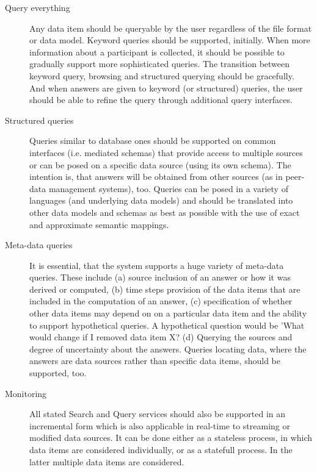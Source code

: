 \begin{description}
\item [Query everything]  Any data item should be queryable  by the user regardless of the file format or data model. Keyword queries should be supported, initially. When more information about a participant is collected, it should be possible to gradually support more sophisticated queries. The transition between keyword query, browsing and structured querying should be gracefully. And when answers are given to keyword (or structured) queries, the user should be able to refine the query through additional query interfaces. 

\item [Structured queries] Queries similar to database ones should be supported on common interfaces (i.e. mediated schemas) that provide access to multiple sources or can be posed on a specific data source (using its own schema). The intention is, that answers will be obtained from other sources (as in peer-data management systems), too. Queries can be posed in a variety of languages (and underlying data models) and should be translated into other data models and schemas as best as possible with the use of exact and approximate semantic mappings.

\item [Meta-data queries] It is essential, that the system supports a huge variety of meta-data queries. These include (a) source inclusion of an answer or how it was derived or computed, (b) time steps provision of the data items that are included in the computation of an answer, (c) specification of whether other data items may depend on on a particular data item and the ability to support hypothetical queries. A hypothetical question would be 'What would change if I removed data item X? (d) Querying the sources and degree of uncertainty about the answers.
Queries locating data, where the answers are data sources rather than specific data items, should be supported, too. 

\item [Monitoring] All stated Search and Query services should also be supported in an incremental form which is also applicable in real-time to streaming or modified data sources. It can be done either as a stateless process, in which data items are considered individually, or as a statefull process. In the latter multiple data items are considered.   
\end{description}

